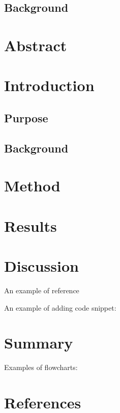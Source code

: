\documentclass{article}
\begin{document}
\subsection{Background}



\tableofcontents
\large

\thispagestyle{empty} 


\newpage 

\section*{Abstract}
\newpage




\section{Introduction}
\vspace{1cm}


\subsection{Purpose}
\subsection{Background}
\section{Method}

\vspace{2cm}


\section{Results}
\newpage


\section{Discussion}

\vspace{0.6cm}
An example of reference \cite{example}\\ %
\vspace{5cm}

An example of adding code snippet:
\vspace{0.6cm}

\lstset{style=main_method}  %




\section{Summary}

Examples of flowcharts:
\vspace{1cm}

\vspace{2cm}


\newpage


\section{References}
\vspace{0.4cm}
\printbibliography[heading=none] %
\end{document}
